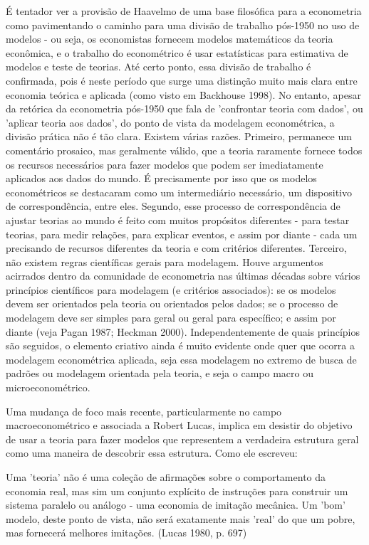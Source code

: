 \documentclass[a4paper,12pt]{article}[abntex2]
\begin{document}
É tentador ver a provisão de Haavelmo de uma base filosófica para a econometria como pavimentando o caminho para uma divisão de trabalho pós-1950 no uso de modelos - ou seja, os economistas fornecem modelos matemáticos da teoria econômica, e o trabalho do econométrico é usar estatísticas para estimativa de modelos e teste de teorias. Até certo ponto, essa divisão de trabalho é confirmada, pois é neste período que surge uma distinção muito mais clara entre economia teórica e aplicada (como visto em Backhouse 1998). No entanto, apesar da retórica da econometria pós-1950 que fala de 'confrontar teoria com dados', ou 'aplicar teoria aos dados', do ponto de vista da modelagem econométrica, a divisão prática não é tão clara. Existem várias razões. Primeiro, permanece um comentário prosaico, mas geralmente válido, que a teoria raramente fornece todos os recursos necessários para fazer modelos que podem ser imediatamente aplicados aos dados do mundo. É precisamente por isso que os modelos econométricos se destacaram como um intermediário necessário, um dispositivo de correspondência, entre eles. Segundo, esse processo de correspondência de ajustar teorias ao mundo é feito com muitos propósitos diferentes - para testar teorias, para medir relações, para explicar eventos, e assim por diante - cada um precisando de recursos diferentes da teoria e com critérios diferentes. Terceiro, não existem regras científicas gerais para modelagem. Houve argumentos acirrados dentro da comunidade de econometria nas últimas décadas sobre vários princípios científicos para modelagem (e critérios associados): se os modelos devem ser orientados pela teoria ou orientados pelos dados; se o processo de modelagem deve ser simples para geral ou geral para específico; e assim por diante (veja Pagan 1987; Heckman 2000). Independentemente de quais princípios são seguidos, o elemento criativo ainda é muito evidente onde quer que ocorra a modelagem econométrica aplicada, seja essa modelagem no extremo de busca de padrões ou modelagem orientada pela teoria, e seja o campo macro ou microeconométrico.

Uma mudança de foco mais recente, particularmente no campo macroeconométrico e associada a Robert Lucas, implica em desistir do objetivo de usar a teoria para fazer modelos que representem a verdadeira estrutura geral como uma maneira de descobrir essa estrutura. Como ele escreveu:

Uma 'teoria' não é uma coleção de afirmações sobre o comportamento da economia real, mas sim um conjunto explícito de instruções para construir um sistema paralelo ou análogo - uma economia de imitação mecânica. Um 'bom' modelo, deste ponto de vista, não será exatamente mais 'real' do que um pobre, mas fornecerá melhores imitações. (Lucas 1980, p. 697)
\end{document}
